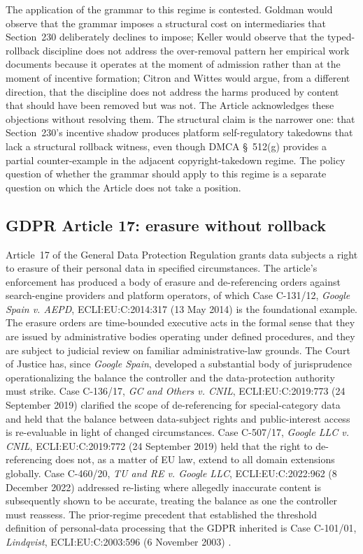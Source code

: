 The application of the grammar to this regime is contested.
Goldman would observe that the grammar imposes a structural cost on intermediaries that Section~230
deliberately declines to impose; Keller would observe that the typed-rollback discipline does not
address the over-removal pattern her empirical work documents because it operates at the moment of
admission rather than at the moment of incentive formation; Citron and Wittes would argue, from a
different direction, that the discipline does not address the harms produced by content that should
have been removed but was not.
The Article acknowledges these objections without resolving them.
The structural claim is the narrower one: that Section~230's incentive shadow produces platform
self-regulatory takedowns that lack a structural rollback witness, even though DMCA \S~512(g) provides
a partial counter-example in the adjacent copyright-takedown regime.
The policy question of whether the grammar should apply to this regime is a separate question on which
the Article does not take a position.

\subsection{GDPR Article 17: erasure without rollback}
\label{sec:cases:gdpr}

Article~17 of the General Data Protection Regulation \cite{ref_gdpr_art17} grants data subjects a
right to erasure of their personal data in specified circumstances.
The article's enforcement has produced a body of erasure and de-referencing orders against search-engine
providers and platform operators, of which Case C-131/12, \emph{Google Spain v. AEPD},
ECLI:EU:C:2014:317 (13 May 2014) \cite{ref_google_spain} is the foundational example.
The erasure orders are time-bounded executive acts in the formal sense that they are issued by
administrative bodies operating under defined procedures, and they are subject to judicial review on
familiar administrative-law grounds.
The Court of Justice has, since \emph{Google Spain}, developed a substantial body of jurisprudence
operationalizing the balance the controller and the data-protection authority must strike.
Case C-136/17, \emph{GC and Others v. CNIL}, ECLI:EU:C:2019:773 (24 September 2019)
\cite{ref_gc_and_others_cnil_2019} clarified the scope of de-referencing for special-category data and
held that the balance between data-subject rights and public-interest access is re-evaluable in light of
changed circumstances.
Case C-507/17, \emph{Google LLC v. CNIL}, ECLI:EU:C:2019:772 (24 September 2019)
\cite{ref_google_cnil_2019} held that the right to de-referencing does not, as a matter of EU law,
extend to all domain extensions globally.
Case C-460/20, \emph{TU and RE v. Google LLC}, ECLI:EU:C:2022:962 (8 December 2022)
\cite{ref_tu_re_google_2022} addressed re-listing where allegedly inaccurate content is subsequently
shown to be accurate, treating the balance as one the controller must reassess.
The prior-regime precedent that established the threshold definition of personal-data processing that
the GDPR inherited is Case C-101/01, \emph{Lindqvist}, ECLI:EU:C:2003:596 (6 November 2003)
\cite{ref_lindqvist_2003}.

